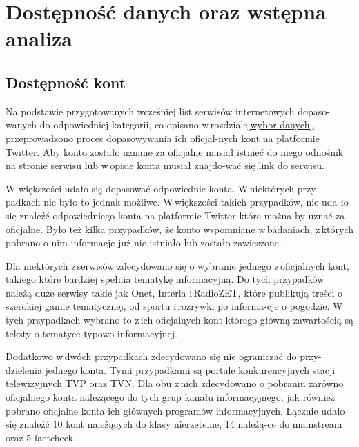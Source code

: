 \newpage
\section{Dostępność danych oraz wstępna analiza}
\subsection{Dostępność kont }
Na podstawie przygotowanych wcześniej list serwisów internetowych dopaso-wanych do odpowiedniej kategorii, co opisano w\,rozdziale\ref{wybor-danych}, przeprowadzono proces dopasowywania ich oficjal-nych kont na platformie Twitter. Aby konto zostało uznane za oficjalne musiał istnieć do niego odnośnik na stronie serwisu lub w\,opisie konta musiał znajdo-wać się link do serwisu. 
\par
W większości udało się dopasować odpowiednie konta. W\,niektórych przy-padkach nie było to jednak możliwe. W\,większości takich przypadków, nie uda-ło się znaleźć odpowiedniego konta na platformie Twitter które można by uznać za oficjalne. Było też kilka przypadków, że konto wspomniane w\,badaniach, z\,których pobrano o nim informacje już nie istniało lub zostało zawieszone.
\par
Dla niektórych z\,serwisów zdecydowano się o wybranie jednego z\,oficjalnych kont, takiego które bardziej spełnia tematykę informacyjną. Do tych przypadków należą duże serwisy takie jak Onet, Interia i\,RadioZET, które publikują treści o szerokiej gamie tematycznej, od sportu i\,rozrywki po informa-cje o pogodzie.  W\,tych przypadkach wybrano to z\,ich oficjalnych kont którego główną zawartością są teksty o tematyce typowo informacyjnej. 
\par
Dodatkowo w\,dwóch przypadkach zdecydowano się nie ograniczać do przy-dzielenia jednego konta. Tymi przypadkami są portale konkurencyjnych stacji telewizyjnych TVP oraz TVN. Dla obu z\,nich zdecydowano o pobraniu zarówno oficjalnego konta należącego do tych grup kanału informacyjnego, jak również pobrano oficjalne konta ich głównych programów informacyjnych. 
Łącznie udało się znaleźć 10 kont należących do klasy nierzetelne, 14 należą-ce do mainstream oraz 5 factcheck.

